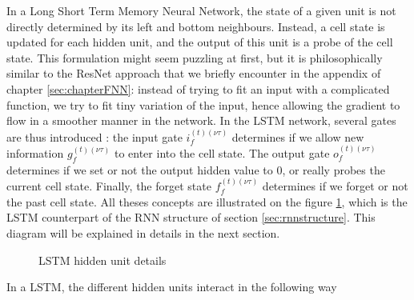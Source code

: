 In a Long Short Term Memory Neural Network\cite{Gers:2000:LFC:1121912.1121915}, the state of a given unit is not directly determined by its left and bottom neighbours. Instead, a cell state is updated for each hidden unit, and the output of this unit is a probe of the cell state. This formulation might seem puzzling at first, but it is philosophically similar to the ResNet approach that we briefly encounter in the appendix of chapter \ref{sec:chapterFNN}: instead of trying to fit an input with a complicated function, we try to fit tiny variation of the input, hence allowing the gradient to flow in a smoother manner in the network. In the LSTM network, several gates are thus introduced : the input gate $i^{(t)(\nu\tau)}_f$ determines if we allow new information $g^{(t)(\nu\tau)}_f$ to enter into the cell state. The  output gate $o^{(t)(\nu\tau)}_f$ determines if we set or not the output hidden value to $0$, or really probes the current cell state. Finally, the forget state $f^{(t)(\nu\tau)}_f$ determines if we forget or not the past cell state. All theses concepts are illustrated on the figure \ref{fig:Lstm1}, which is the LSTM counterpart of the RNN structure of section \ref{sec:rnnstructure}. This diagram will be explained in details in the next section.

\begin{figure}[H]
\begin{center}
\caption{\label{fig:Lstm1}LSTM hidden unit details}
\end{center}
\end{figure}

In a LSTM, the different hidden units interact in the following way

